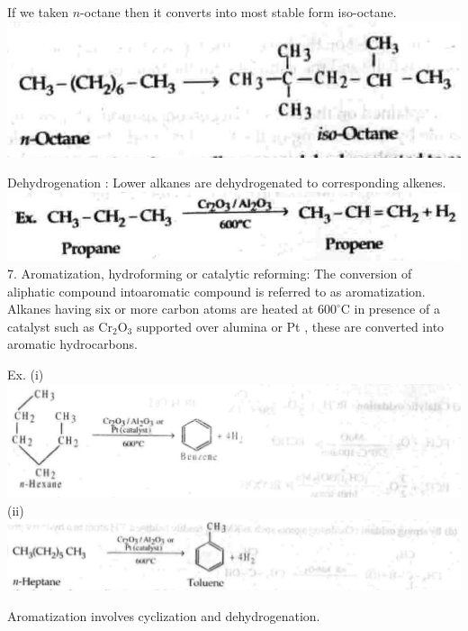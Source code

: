 \documentclass[10pt]{article}
\begin{document}
If we taken $n$-octane then it converts into most stable form iso-octane.\\
\includegraphics[max width=\textwidth, center]{2025_01_28_8470952b98110cec3aabg-175(2)}

Dehydrogenation : Lower alkanes are dehydrogenated to corresponding alkenes.\\
\includegraphics[max width=\textwidth, center]{2025_01_28_8470952b98110cec3aabg-175(3)}\\
7. Aromatization, hydroforming or catalytic reforming: The conversion of aliphatic compound intoaromatic compound is referred to as aromatization. Alkanes having six or more carbon atoms are heated at $600^{\circ} \mathrm{C}$ in presence of a catalyst such as $\mathrm{Cr}_{2} \mathrm{O}_{3}$ supported over alumina or Pt , these are converted into aromatic hydrocarbons.

Ex. (i)\\
\includegraphics[max width=\textwidth, center]{2025_01_28_8470952b98110cec3aabg-176(3)}\\
(ii)\\
\includegraphics[max width=\textwidth, center]{2025_01_28_8470952b98110cec3aabg-176(2)}

Aromatization involves cyclization and dehydrogenation.
\end{document}
